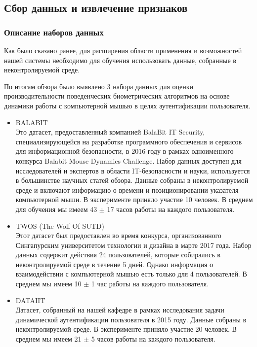 \documentclass[12pt]{article}
\begin{document}
    \subsection{Сбор данных и извлечение признаков}
    \label{sec:Research:Data}

    \subsubsection{Описание наборов данных}
    \label{sec:Research:Data:Description}

    \par Как было сказано ранее, для расширения области применения и возможностей нашей системы необходимо для обучения использовать данные, собранные в неконтролируемой среде.

    \par По итогам обзора было выявлено 3 набора данных для оценки производительности поведенческих биометрических алгоритмов на основе динамики работы с компьютерной мышью в целях аутентификации пользователя.

    \begin{itemize}
        \item \textsc{BALABIT} \cite{BALABIT} \\
        Это датасет, предоставленный компанией BalaBit IT Security, специализирующейся на разработке программного обеспечения и сервисов для информационной безопасности, в 2016 году в рамках одноименного конкурса Balabit Mouse Dynamics Challenge. Набор данных доступен для исследователей и экспертов в области IT-безопасности и науки, используется в большинстве научных статей обзора. Данные собраны в неконтролируемой среде и включают информацию о времени и позиционировании указателя компьютерной мыши. В эксперименте приняло участие 10 человек. В среднем для обучения мы имеем 43 $\pm$ 17 часов работы на каждого пользователя.

        \item \textsc{TWOS} (The Wolf Of SUTD) \cite{TWOS} \\
        Этот датасет был предоставлен во время конкурса, организованного Сингапурским университетом технологии и дизайна в марте 2017 года. Набор данных содержит действия 24 пользователей, которые собирались в неконтролируемой среде в течение 5 дней. Однако информация о взаимодействии с компьютерной мышью есть только для 4 пользователей. В среднем мы имеем 10 $\pm$ 1 час работы на каждого пользователя.

        \item \textsc{DATAIIT} \\
        Датасет, собранный на нашей кафедре в рамках исследования задачи динамической аутентификации пользователя в 2015 году. Данные собраны в неконтролируемой среде. В эксперименте приняло участие 20 человек. В среднем мы имеем 21 $\pm$ 5 часов работы на каждого пользователя.
    \end{itemize}
\end{document}
